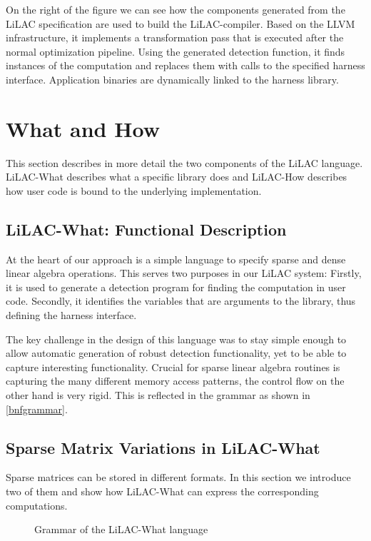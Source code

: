 On the right of the figure we can see how the components generated from the
LiLAC specification are used to build the LiLAC-compiler.
Based on the LLVM infrastructure, it implements a transformation pass that
is executed after the normal optimization pipeline.
Using the generated detection function, it finds instances of the computation
and replaces them with calls to the specified harness interface.
Application binaries are dynamically linked to the harness library.

\section{What and How}

This section describes in more detail the two components of the LiLAC language.
LiLAC-What describes what a specific library does and LiLAC-How describes how
user code is bound to the underlying implementation.

\subsection{LiLAC-What: Functional Description}
At the heart of our approach is a simple language to specify sparse and dense
linear algebra operations.
This serves two purposes in our LiLAC system: Firstly, it is used to generate
a detection program for finding the computation in user code.
Secondly, it identifies the variables that are arguments to the library, thus
defining the harness interface.

The key challenge in the design of this language was to stay simple enough
to allow automatic generation of robust detection functionality, yet to be able
to capture interesting functionality.
Crucial for sparse linear algebra routines is capturing the many different
memory access patterns, the control flow on the other hand is very rigid.
This is reflected in the grammar as shown in \autoref{bnfgrammar}.

\subsection{Sparse Matrix Variations in LiLAC-What}
Sparse matrices can be stored in different formats.
In this section we introduce two of them and show how LiLAC-What can express
the corresponding computations.

\begin{figure}[t]

\vspace{-1.5em}
\caption{Grammar of the LiLAC-What language}
\label{bnfgrammar}
\end{figure}

